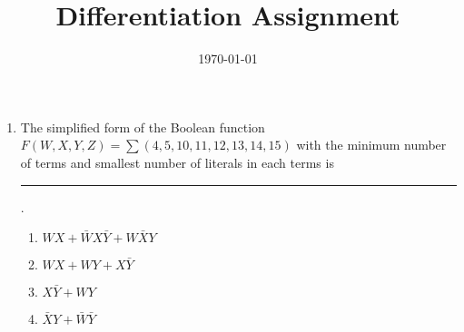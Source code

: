 \documentclass[12pt]{article}
\title{Differentiation Assignment}
\date{\today}
\begin{document}


\begin{enumerate}
    \item The simplified form of the Boolean function $F(W,X,Y,Z)=\sum(4,5,10,11,12,13,14,15)$ with the minimum number of terms and smallest number of literals in each terms is \rule{60pt}{1pt}.
\begin{enumerate}
    \item $WX+\bar WX\bar Y+W\bar XY$
    \item $WX+WY+X\bar Y$
    \item $X\bar Y+WY$
    \item $\bar XY+\bar W\bar Y$
\end{enumerate}
\end{enumerate}
    
\end{document}
